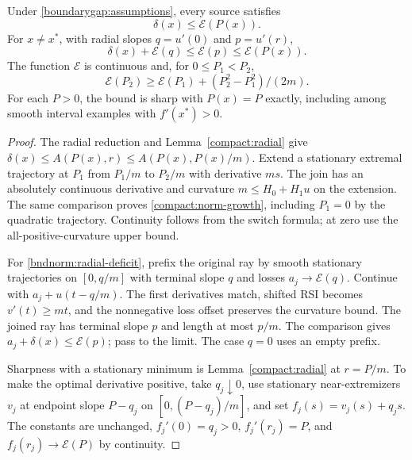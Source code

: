 \begin{theorem}
\label{bndnorm:main}\label{energy:main}
Under \eqref{boundarygap:assumptions}, every source satisfies
\begin{equation}\label{bndnorm:observable}
 \delta(x)\le\mathcal E(P(x)).
\end{equation}
For $x\ne x^*$, with radial slopes $q=u'(0)$ and $p=u'(r)$,
\begin{equation}\label{bndnorm:radial-deficit}
 \delta(x)+\mathcal E(q)\le\mathcal E(p)\le\mathcal E(P(x)).
\end{equation}
The function $\mathcal E$ is continuous and, for $0\le P_1<P_2$,
\begin{equation}\label{compact:norm-growth}
 \mathcal E(P_2)\ge\mathcal E(P_1)+(P_2^2-P_1^2)/(2m).
\end{equation}
For each $P>0$, the bound is sharp with $P(x)=P$ exactly, including
among smooth interval examples with $f'(x^*)>0$.
\end{theorem}
\begin{proof}
The radial reduction and Lemma~\ref{compact:radial} give
$\delta(x)\le A(P(x),r)\le A(P(x),P(x)/m)$.
Extend a stationary extremal trajectory at $P_1$ from $P_1/m$ to
$P_2/m$ with derivative $ms$. The join has an absolutely continuous
derivative and curvature $m\le H_0+H_1u$ on the extension.
The same comparison proves \eqref{compact:norm-growth}, including
$P_1=0$ by the quadratic trajectory. Continuity follows from the
switch formula; at zero use the all-positive-curvature upper bound.

For \eqref{bndnorm:radial-deficit}, prefix the original ray by smooth
stationary trajectories on $[0,q/m]$ with terminal slope $q$ and losses
$a_j\to\mathcal E(q)$. Continue with $a_j+u(t-q/m)$.
The first derivatives match, shifted RSI becomes $v'(t)\ge mt$,
and the nonnegative loss offset preserves the curvature bound.
The joined ray has terminal slope $p$ and length at most $p/m$.
The comparison gives $a_j+\delta(x)\le\mathcal E(p)$; pass to the
limit. The case $q=0$ uses an empty prefix.

Sharpness with a stationary minimum is Lemma~\ref{compact:radial}
at $r=P/m$. To make the optimal derivative positive, take
$q_j\downarrow0$, use stationary near-extremizers $v_j$ at endpoint
slope $P-q_j$ on $[0,(P-q_j)/m]$, and set $f_j(s)=v_j(s)+q_js$.
The constants are unchanged, $f_j'(0)=q_j>0$, $f_j'(r_j)=P$, and
$f_j(r_j)\to\mathcal E(P)$ by continuity.
\end{proof}

